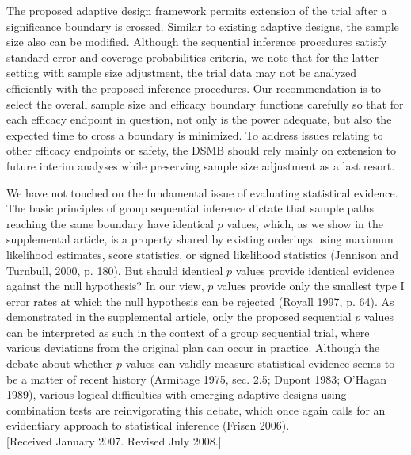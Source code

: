 \documentclass[10pt]{article}
\begin{document}
The proposed adaptive design framework permits extension of the trial after a significance boundary is crossed. Similar to existing adaptive designs, the sample size also can be modified. Although the sequential inference procedures satisfy standard error and coverage probabilities criteria, we note that for the latter setting with sample size adjustment, the trial data may not be analyzed efficiently with the proposed inference procedures. Our recommendation is to select the overall sample size and efficacy boundary functions carefully so that for each efficacy endpoint in question, not only is the power adequate, but also the expected time to cross a boundary is minimized. To address issues relating to other efficacy endpoints or safety, the DSMB should rely mainly on extension to future interim analyses while preserving sample size adjustment as a last resort.

We have not touched on the fundamental issue of evaluating statistical evidence. The basic principles of group sequential inference dictate that sample paths reaching the same boundary have identical $p$ values, which, as we show in the supplemental article, is a property shared by existing orderings using maximum likelihood estimates, score statistics, or signed likelihood statistics (Jennison and Turnbull, 2000, p. 180). But should identical $p$ values provide identical evidence against the null hypothesis? In our view, $p$ values provide only the smallest type I error rates at which the null hypothesis can be rejected (Royall 1997, p. 64). As demonstrated in the supplemental article, only the proposed sequential $p$ values can be interpreted as such in the context of a group sequential trial, where various deviations from the original plan can occur in practice. Although the debate about whether $p$ values can validly measure statistical evidence seems to be a matter of recent history (Armitage 1975, sec. 2.5; Dupont 1983; O'Hagan 1989), various logical difficulties with emerging adaptive designs using combination tests are reinvigorating this debate, which once again calls for an evidentiary approach to statistical inference (Frisen 2006).\\[0pt]
[Received January 2007. Revised July 2008.]
\end{document}
